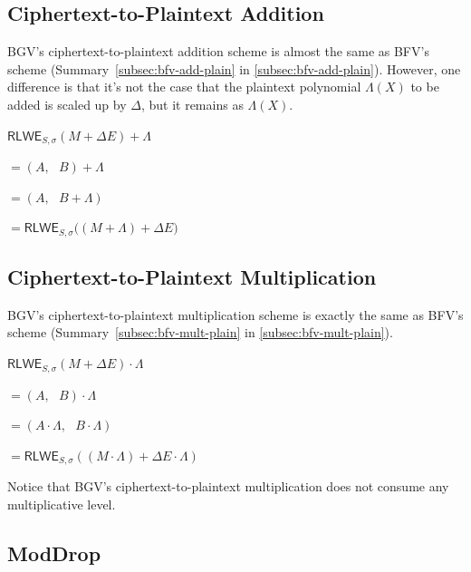 \subsection{Ciphertext-to-Plaintext Addition}
\label{subsec:bgv-add-plain}

BGV's ciphertext-to-plaintext addition scheme is almost the same as BFV's scheme (Summary~\ref*{subsec:bfv-add-plain} in \autoref{subsec:bfv-add-plain}). However, one difference is that it's not the case that the plaintext polynomial $\Lambda(X)$ to be added is scaled up by $\Delta$, but it remains as $\Lambda(X)$.

\begin{tcolorbox}[title={\textbf{\tboxlabel{\ref*{subsec:bgv-add-plain}} BGV Ciphertext-to-Plaintext Addition}}]
$\textsf{RLWE}_{S, \sigma}(M + \Delta E) + \Lambda $

$=  (A, \text{ } B) + \Lambda$

$=  (A, \text{ } B + \Lambda)$

$= \textsf{RLWE}_{S, \sigma}\bm((M + \Lambda) + \Delta E \bm)$
\end{tcolorbox}


\subsection{Ciphertext-to-Plaintext Multiplication}
\label{subsec:bgv-mult-plain}




BGV's ciphertext-to-plaintext multiplication scheme is exactly the same as BFV's scheme (Summary~\ref*{subsec:bfv-mult-plain} in \autoref{subsec:bfv-mult-plain}).


\begin{tcolorbox}[title={\textbf{\tboxlabel{\ref*{subsec:bgv-mult-plain}} BGV Ciphertext-to-Plaintext Multiplication}}]
$\textsf{RLWE}_{S, \sigma}(M + \Delta E) \cdot \Lambda$

$= (A, \text{ } B) \cdot \Lambda$

$= (A \cdot \Lambda, \text{ }  B \cdot \Lambda )$

$= \textsf{RLWE}_{S, \sigma}((M \cdot \Lambda) + \Delta E\cdot \Lambda )$
\end{tcolorbox}

Notice that BGV's ciphertext-to-plaintext multiplication does not consume any multiplicative level.

\subsection{\textsf{ModDrop}}
\label{subsec:bgv-moddrop}

